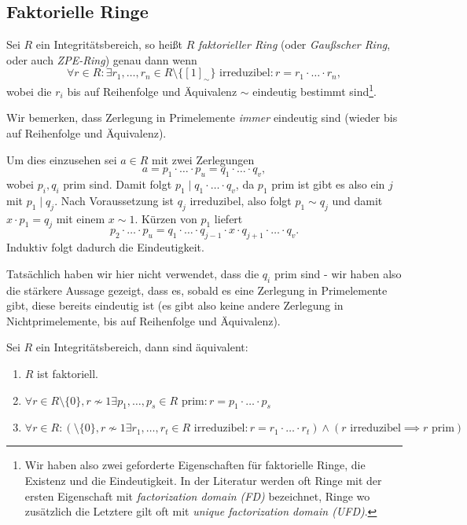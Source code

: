 

\subsection{Faktorielle Ringe}

\begin{definition}
    Sei $R$ ein Integritätsbereich, so heißt $R$ \emph{faktorieller Ring} (oder \emph{Gaußscher Ring}, oder auch \emph{ZPE-Ring}) genau dann wenn
    $$ \forall r \in R : \exists r_1, \hdots, r_n \in R \setminus \{ [1]_\sim \} \text{ irreduzibel} : r = r_1 \cdot \hdots \cdot r_n, $$
    wobei die $r_i$ bis auf Reihenfolge und Äquivalenz $\sim$ eindeutig bestimmt sind\footnote{Wir haben also zwei geforderte Eigenschaften für faktorielle Ringe, die Existenz und die Eindeutigkeit. In der Literatur werden oft Ringe mit der ersten Eigenschaft mit \emph{factorization domain (FD)} bezeichnet, Ringe wo zusätzlich die Letztere gilt oft mit \emph{unique factorization domain (UFD)}.}.
\end{definition}

\begin{remark}
    Wir bemerken, dass Zerlegung in Primelemente \emph{immer} eindeutig sind (wieder bis auf Reihenfolge und Äquivalenz).

    Um dies einzusehen sei $a \in R$ mit zwei Zerlegungen
    $$ a = p_1 \cdot \hdots \cdot p_u = q_1 \cdot \hdots \cdot q_v, $$
    wobei $p_i, q_i$ prim sind. Damit folgt $p_1 \mid q_1 \cdot \hdots \cdot q_v$, da $p_1$ prim ist gibt es also ein $j$ mit $p_1 \mid q_j$. Nach Voraussetzung ist $q_j$ irreduzibel, also folgt $p_1 \sim q_j$ und damit $x \cdot p_1 = q_j$ mit einem $x \sim 1$. Kürzen von $p_1$ liefert
    $$ p_2 \cdot \hdots \cdot p_u = q_1 \cdot \hdots \cdot q_{j-1} \cdot x \cdot q_{j+1} \cdot \hdots \cdot q_v. $$
    Induktiv folgt dadurch die Eindeutigkeit.

    Tatsächlich haben wir hier nicht verwendet, dass die $q_i$ prim sind - wir haben also die stärkere Aussage gezeigt, dass es, sobald es eine Zerlegung in Primelemente gibt, diese bereits eindeutig ist (es gibt also keine andere Zerlegung in Nichtprimelemente, bis auf Reihenfolge und Äquivalenz).
\end{remark}

\begin{proposition}
    Sei $R$ ein Integritätsbereich, dann sind äquivalent:
    \begin{enumerate}
        \item $R$ ist faktoriell.
        \item $ \forall r \in R \setminus \{0\}, r \not\sim 1 \exists p_1, \hdots, p_s \in R \text{ prim}: r = p_1 \cdot \hdots \cdot p_s $
        \item $ \forall r \in R: ( \setminus \{0\}, r \not\sim 1 \exists r_1, \hdots, r_t \in R \text{ irreduzibel}: r = r_1 \cdot \hdots \cdot r_t ) \land ( r \text{ irreduzibel} \implies r \text{ prim} ) $
    \end{enumerate}
\end{proposition}


